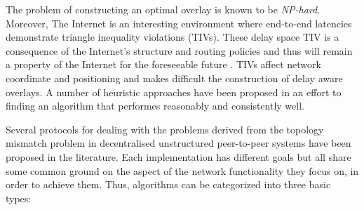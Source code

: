 \documentclass[a4paper,10pt]{article}
\begin{document}
The problem of constructing an optimal overlay is known to be \emph{NP-hard}\cite{chawathe_scattercast_2000}. Moreover, The Internet is an interesting environment where end-to-end latencies demonstrate triangle inequality violations (TIVs). These delay space TIV is a consequence of the Internet's structure and routing policies and thus will remain a property of the Internet for the foreseeable future \cite{zheng_irprtt_2005}. TIVs affect network coordinate \cite{cox_vivaldi_2004, wong_meridian_2005} and positioning \cite{ng_gnp_2001} and makes difficult the construction of delay aware overlays. A number of heuristic approaches have been proposed in an effort to finding an algorithm that performes reasonably and consistently well.

Several protocols for dealing with the problems derived from the topology mismatch problem in decentralised unstructured peer-to-peer systems have been proposed in the literature. Each implementation has different goals but all share some common ground on the aspect of the network functionality they focus on, in order to achieve them. Thus, algorithms can be categorized into three basic types:
\end{document}
